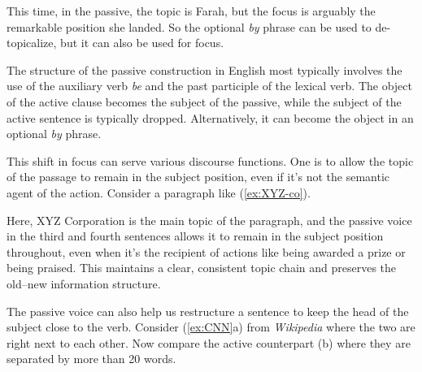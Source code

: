 \ea\label{ex:new-manager-by-phrase}
    \z
\z

This time, in the passive, the topic is Farah, but the focus is arguably the remarkable position she landed. So the optional \textit{by} phrase can be used to de-topicalize, but it can also be used for focus.

The structure of the passive construction in English most typically involves the use of the auxiliary verb \textit{be} and the past participle of the lexical verb. The object of the active clause becomes the subject of the passive, while the subject of the active sentence is typically dropped. Alternatively, it can become the object in an optional \textit{by} phrase.

This shift in focus can serve various discourse functions. One is to allow the topic of the passage to remain in the subject position, even if it's not the semantic agent of the action. Consider a paragraph like (\ref{ex:XYZ-co}).

\label{ex:XYZ-co}
\z

Here, XYZ Corporation is the main topic of the paragraph, and the passive voice in the third and fourth sentences allows it to remain in the subject position throughout, even when it's the recipient of actions like being awarded a prize or being praised. This maintains a clear, consistent topic chain and preserves the old--new information structure.

The passive voice can also help us restructure a sentence to keep the head of the subject close to the verb. Consider (\ref{ex:CNN}a) from \textit{Wikipedia} where the two are right next to each other. Now compare the active counterpart (b) where they are separated by more than 20 words.

\ea\label{ex:CNN}
    \z
\z

